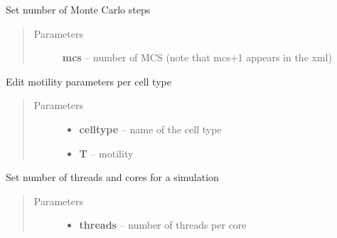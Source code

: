 \documentclass[letterpaper,10pt,english]{sphinxmanual}
\begin{document}
\begin{fulllineitems}
\begin{fulllineitems}
\begin{quote}
\begin{description}
\end{description}\end{quote}

\end{fulllineitems}


\begin{fulllineitems}
\label{Experiment:Experiment.Experiment.setMCS}
Set number of Monte Carlo steps
\begin{quote}\begin{description}
\item[{Parameters}] \leavevmode
\textbf{mcs} -- number of MCS (note that mcs+1 appears in the xml)

\end{description}\end{quote}

\end{fulllineitems}


\begin{fulllineitems}
\label{Experiment:Experiment.Experiment.setMotility}
Edit motility parameters per cell type
\begin{quote}\begin{description}
\item[{Parameters}] \leavevmode\begin{itemize}
\item {} 
\textbf{celltype} -- name of the cell type

\item {} 
\textbf{T} -- motility

\end{itemize}

\end{description}\end{quote}

\end{fulllineitems}


\begin{fulllineitems}
\label{Experiment:Experiment.Experiment.setMultiCore}
Set number of threads and cores for a simulation
\begin{quote}\begin{description}
\item[{Parameters}] \leavevmode\begin{itemize}
\item {} 
\textbf{threads} -- number of threads per core


\end{itemize}
\end{description}
\end{quote}
\end{fulllineitems}
\end{fulllineitems}
\end{document}
